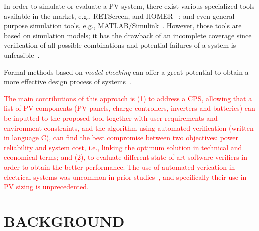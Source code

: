 \documentclass[10pt,conference]{IEEEtran}
\begin{document}
In order to simulate or evaluate a PV system, there exist various specialized tools available in the market, e.g., RETScreen, and HOMER~\cite{Pradhan,Swarnkar}%
; and even general purpose simulation tools, e.g., MATLAB/Simulink~\cite{Gow1999}. %
 However, those tools are based on simulation models; it has the drawback of an incomplete coverage since verification of all possible combinations and potential failures of a system is unfeasible~\cite{ClarkeHV18}.

Formal methods based on \textit{model checking} can offer a great potential to obtain a more effective design process of systems~\cite{ClarkeHV18}. %

\textcolor{red}{The main contributions of this approach is (1) to address a CPS, allowing that a list of PV components (PV panels, charge controllers, inverters and batteries) can be inputted to the proposed tool together with user requirements and environment constraints, and the algorithm using automated verification (written in language C), can find the best compromise between two objectives: power reliability and system cost, i.e., linking the optimum solution in technical and economical terms; and (2), to evaluate different state-of-art software verifiers in order to obtain the better performance. The use of automated verication in electrical systems was uncommon in prior studies~\cite{abs-1811-09438}, and specifically their use in PV sizing is unprecedented.}
%
%
\section{BACKGROUND}
\label{sec:AutomatedVerification}
\end{document}
